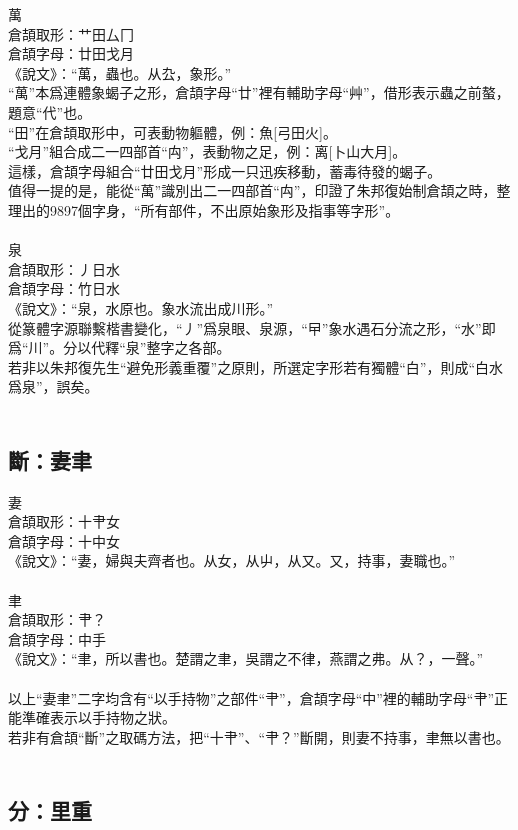 \documentclass{article}
\begin{document}
萬\\
倉頡取形：艹田厶冂\\
倉頡字母：廿田戈月\\
《說文》：“萬，蟲也。从厹，象形。”\\
“萬”本爲連體象蝎子之形，倉頡字母“廿”裡有輔助字母“艸”，借形表示蟲之前螯，題意“代”也。\\
“田”在倉頡取形中，可表動物軀體，例：魚[弓田火]。\\
“戈月”組合成二一四部首“禸”，表動物之足，例：离[卜山大月]。\\
這樣，倉頡字母組合“廿田戈月”形成一只迅疾移動，蓄毒待發的蝎子。\\
值得一提的是，能從“萬”識別出二一四部首“禸”，印證了朱邦復始制倉頡之時，整理出的9897個字身，“所有部件，不出原始象形及指事等字形”。\\
\\
泉\\
倉頡取形：丿日水\\
倉頡字母：竹日水\\
《說文》：“泉，水原也。象水流出成川形。”\\
從篆體字源聯繫楷書變化，“丿”爲泉眼、泉源，“曱”象水遇石分流之形，“水”即爲“川”。分以代釋“泉”整字之各部。\\
若非以朱邦復先生“避免形義重覆”之原則，所選定字形若有獨體“白”，則成“白水爲泉”，誤矣。\\
\\
\subsection{斷：妻聿}

妻\\
倉頡取形：十肀女\\
倉頡字母：十中女\\
《說文》：“妻，婦與夫齊者也。从女，从屮，从又。又，持事，妻職也。”\\
\\
聿\\
倉頡取形：肀？\\
倉頡字母：中手\\
《說文》：“聿，所以書也。楚謂之聿，吳謂之不律，燕謂之弗。从？，一聲。”\\
\\
以上“妻聿”二字均含有“以手持物”之部件“肀”，倉頡字母“中”裡的輔助字母“肀”正能準確表示以手持物之狀。\\
若非有倉頡“斷”之取碼方法，把“十肀”、“肀？”斷開，則妻不持事，聿無以書也。\\
\\
\subsection{分：里重}
\end{document}
